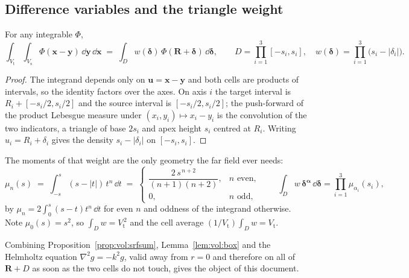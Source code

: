 \subsection{Difference variables and the triangle weight}
\label{sec:vol:diff}

\begin{lemma}
\label{lem:vol:box}
For any integrable $\Phi$,
\begin{equation}
\int_{V_{\mathrm{t}}}\!\int_{V_{\mathrm{s}}} \Phi(\mathbf{x}-\mathbf{y})\,
\dd\mathbf{y}\,\dd\mathbf{x}
\;=\; \int_{D} w(\boldsymbol{\delta})\,\Phi(\mathbf{R}+\boldsymbol{\delta})\,
\dd\boldsymbol{\delta},
\qquad
D = \prod_{i=1}^{3}[-s_i, s_i],
\quad
w(\boldsymbol{\delta}) = \prod_{i=1}^{3}\bigl(s_i - |\delta_i|\bigr).
\label{eq:vol:diffbox}
\end{equation}
\end{lemma}

\begin{proof}
The integrand depends only on $\mathbf{u} = \mathbf{x}-\mathbf{y}$ and both cells are
products of intervals, so the identity factors over the axes. On axis $i$ the target
interval is $R_i + [-s_i/2, s_i/2]$ and the source interval is $[-s_i/2, s_i/2]$; the
push-forward of the product Lebesgue measure under $(x_i,y_i)\mapsto x_i - y_i$ is the
convolution of the two indicators, a triangle of base $2s_i$ and apex height $s_i$
centred at $R_i$. Writing $u_i = R_i + \delta_i$ gives the density $s_i - |\delta_i|$ on
$[-s_i,s_i]$.
\end{proof}

The moments of that weight are the only geometry the far field ever needs:
\begin{equation}
\mu_n(s) \;=\; \int_{-s}^{s}(s-|t|)\,t^n\,\dd t
\;=\; \begin{cases} \dfrac{2\,s^{\,n+2}}{(n+1)(n+2)}, & n \text{ even},\\[4pt]
0, & n \text{ odd},\end{cases}
\qquad
\int_D w\,\boldsymbol{\delta}^{\boldsymbol{\alpha}}\,\dd\boldsymbol{\delta}
= \prod_{i=1}^{3}\mu_{\alpha_i}(s_i),
\label{eq:vol:mu}
\end{equation}
by $\mu_n = 2\int_0^s (s-t)t^n\,\dd t$ for even $n$ and oddness of the integrand
otherwise. Note $\mu_0(s) = s^2$, so $\int_D w = V_{\mathrm{t}}^{\,2}$ and the cell
average $(1/V_{\mathrm{t}})\int_D w = V_{\mathrm{t}}$.

Combining Proposition~\ref{prop:vol:srfsum}, Lemma~\ref{lem:vol:box} and the Helmholtz
equation $\nabla^2 g = -k^2 g$, valid away from $r = 0$ and therefore on all of
$\mathbf{R}+D$ as soon as the two cells do not touch, gives the object of this document.

